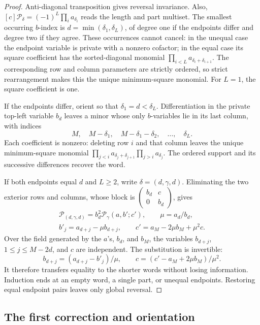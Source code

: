 \documentclass[11pt,a4paper]{amsart}
\numberwithin{equation}{section}
\theoremstyle{plain}
\theoremstyle{definition}
\begin{document}
\begin{proof}
Anti-diagonal transposition gives reversal invariance.  Also,
\([c]\mathcal P_\delta=(-1)^L\prod_i a_{\delta_i}\)
reads the length and part multiset.  The smallest occurring \(b\)-index
is \(d=\min(\delta_1,\delta_L)\), of degree one if the
endpoints differ and degree two if they agree.  These occurrences cannot
cancel: in the unequal case the endpoint variable is private with a
nonzero cofactor; in the equal case its square coefficient has the
sorted-diagonal monomial \(\prod_{i<L}a_{\delta_i+\delta_{i+1}}\).
The corresponding row and column parameters are strictly ordered, so
strict rearrangement makes this the unique minimum-square monomial.
For \(L=1\), the square coefficient is one.

If the endpoints differ, orient so that \(\delta_1=d<\delta_L\).
Differentiation in the private top-left variable \(b_d\) leaves a
minor whose only \(b\)-variables lie in its last column, with indices
\[
 M,\quad M-\delta_1,\quad M-\delta_1-\delta_2,\quad\ldots,
 \quad\delta_L.
\]
Each coefficient is nonzero: deleting row \(i\) and that column
leaves the unique minimum-square monomial
\(\prod_{j<i}a_{\delta_j+\delta_{j+1}}
  \prod_{j>i}a_{\delta_j}\).
The ordered support and its successive differences recover the word.

If both endpoints equal \(d\) and \(L\ge2\), write
\(\delta=(d,\gamma,d)\).  Eliminating the two exterior rows
and columns, whose block is
\(\left(\begin{smallmatrix}b_d&c\\0&b_d\end{smallmatrix}\right)\), gives
\[
 \begin{gathered}
 \mathcal P_{(d,\gamma,d)}=b_d^2\mathcal P_\gamma(a,b';c'),\qquad
 \mu=a_d/b_d,\\
 b'_j=a_{d+j}-\mu b_{d+j},\qquad
 c'=a_M-2\mu b_M+\mu^2c.
 \end{gathered}
\]
Over the field generated by the \(a\)'s, \(b_d\), and \(b_M\),
the variables \(b_{d+j}\), \(1\le j\le M-2d\), and
\(c\) are independent.  The substitution is invertible:
\[
 b_{d+j}=(a_{d+j}-b'_j)/\mu,\qquad
 c=(c'-a_M+2\mu b_M)/\mu^2.
\]
It therefore transfers equality to the shorter words without losing
information.  Induction ends at an empty word, a single part, or unequal
endpoints.  Restoring equal endpoint pairs leaves only global reversal.
\end{proof}

\subsection{The first correction and orientation}\label{subsec:orientation}
\end{document}
